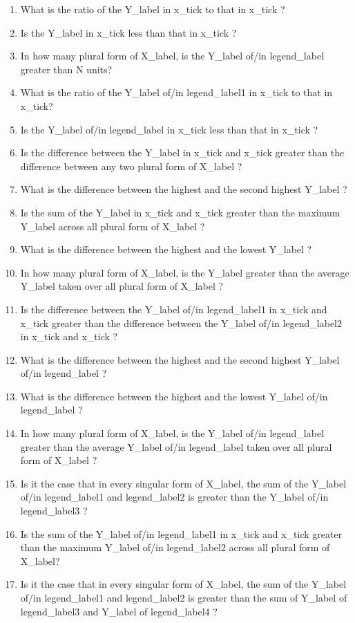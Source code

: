 \documentclass[10pt,twocolumn,letterpaper]{article}
\begin{document}
\begin{enumerate}
\begin{enumerate}[1.]
        \item What is the ratio of the Y\_label in  x\_tick to that in  x\_tick ?
        \item Is the Y\_label in  x\_tick less than that in  x\_tick ?
        \item In how many plural form of X\_label, is the Y\_label of/in legend\_label greater than N units?
        \item What is the ratio of the Y\_label of/in legend\_label1 in  x\_tick to that in x\_tick?
        \item Is the Y\_label of/in legend\_label in   x\_tick less than that in  x\_tick ?
        \item Is the difference between the Y\_label in x\_tick and x\_tick greater than the difference between any two plural form of X\_label ?
        \item What is the difference between the highest and the second highest Y\_label ?
        \item Is the sum of the Y\_label in x\_tick and x\_tick greater than the maximum Y\_label across all plural form of X\_label ?
        \item What is the difference between the highest and the lowest Y\_label ?
        \item In how many plural form of X\_label, is the Y\_label greater than the average Y\_label taken over all plural form of X\_label ?
        \item Is the difference between the Y\_label of/in legend\_label1 in x\_tick and x\_tick greater than the difference between the Y\_label of/in legend\_label2 in x\_tick and x\_tick ?
        \item What is the difference between the highest and the second highest Y\_label of/in legend\_label ?
        \item What is the difference between the highest and the lowest Y\_label of/in legend\_label ?
        \item In how many plural form of X\_label, is the Y\_label of/in legend\_label greater than the average Y\_label of/in legend\_label taken over all plural form of X\_label ?
        \item Is it the case that in every singular form of X\_label, the sum of the Y\_label of/in legend\_label1 and legend\_label2 is greater than the Y\_label of/in legend\_label3 ?
        \item Is the sum of the Y\_label of/in legend\_label1 in x\_tick and x\_tick greater than the maximum Y\_label of/in legend\_label2 across all plural form of X\_label?
        \item Is it the case that in every singular form of X\_label, the sum of the Y\_label of/in legend\_label1 and legend\_label2 is greater than the sum of Y\_label of legend\_label3 and Y\_label of legend\_label4 ?
    \end{enumerate}
    
\end{enumerate}
\end{document}
